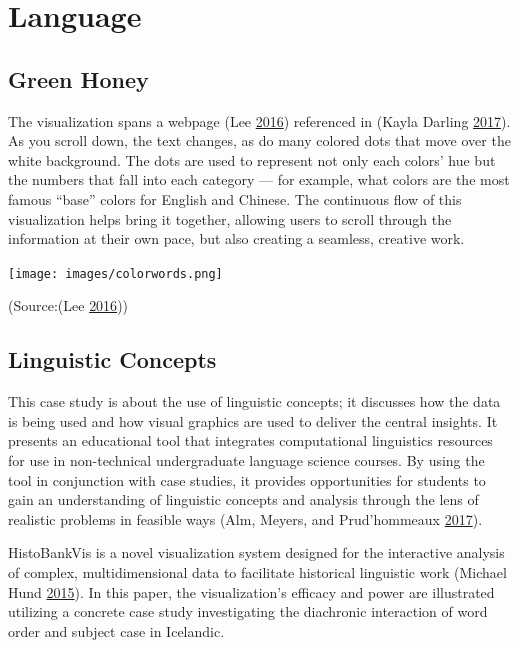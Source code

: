 \documentclass[]{book}
\begin{document}
\hypertarget{language}{%
\section{Language}\label{language}}

\hypertarget{green-honey}{%
\subsection{Green Honey}\label{green-honey}}

The visualization spans a webpage (Lee \protect\hyperlink{ref-green_honey}{2016}) referenced in (Kayla Darling \protect\hyperlink{ref-cool_data}{2017}). As you scroll down, the text changes, as do many colored dots that move over the white background. The dots are used to represent not only each colors' hue but the numbers that fall into each category --- for example, what colors are the most famous ``base'' colors for English and Chinese. The continuous flow of this visualization helps bring it together, allowing users to scroll through the information at their own pace, but also creating a seamless, creative work.

\texttt{[image: images/colorwords.png]}

(Source:(Lee \protect\hyperlink{ref-green_honey}{2016}))

\hypertarget{linguistic-concepts}{%
\subsection{Linguistic Concepts}\label{linguistic-concepts}}

This case study is about the use of linguistic concepts; it discusses how the data is being used and how visual graphics are used to deliver the central insights. It presents an educational tool that integrates computational linguistics resources for use in non-technical undergraduate language science courses. By using the tool in conjunction with case studies, it provides opportunities for students to gain an understanding of linguistic concepts and analysis through the lens of realistic problems in feasible ways (Alm, Meyers, and Prud'hommeaux \protect\hyperlink{ref-lingui_data}{2017}).

HistoBankVis is a novel visualization system designed for the interactive analysis of complex, multidimensional data to facilitate historical linguistic work (Michael Hund \protect\hyperlink{ref-lingui_data1}{2015}). In this paper, the visualization's efficacy and power are illustrated utilizing a concrete case study investigating the diachronic interaction of word order and subject case in Icelandic.
\end{document}
